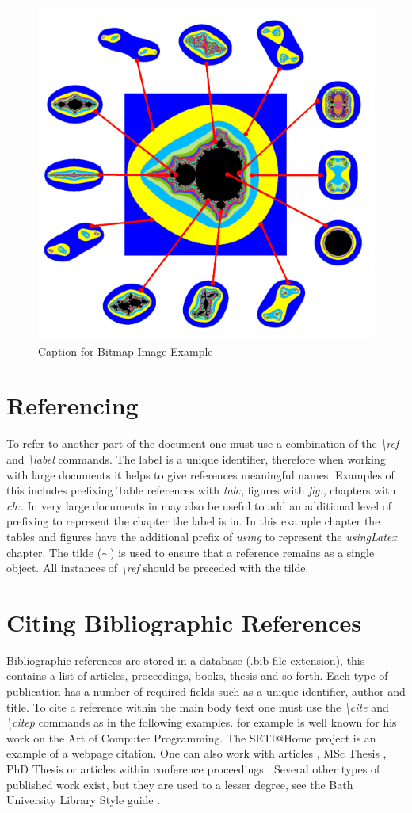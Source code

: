 \begin{figure}[H]
\begin{center}
\includegraphics[width=.34\linewidth]{resources/samplepng}
\caption{Caption for Bitmap Image Example} \label{fig:using:samplepngImage}
\end{center}
\end{figure}

\section{Referencing}

To refer to another part of the document one must use a combination of the \emph{\textbackslash ref} and \emph{\textbackslash label} commands. The label is a unique identifier, therefore when working with large documents it helps to give references meaningful names. Examples of this includes prefixing Table references with \emph{tab:}, figures with \emph{fig:}, chapters with \emph{ch:}. In very large documents in may also be useful to add an additional level of prefixing to represent the chapter the label is in. In this example chapter the tables and figures have the additional prefix of \emph{using} to represent the \emph{usingLatex} chapter. The tilde ($\sim$) is used to ensure that a reference remains as a single object. All instances of \emph{\textbackslash ref} should be preceded with the tilde.

\section{Citing Bibliographic References}

Bibliographic references are stored in a database (.bib file extension), this contains a list of articles, proceedings, books, thesis and so forth. Each type of publication has a number of required fields such as a unique identifier, author and title. To cite a reference within the main body text one must use the \emph{\textbackslash cite} and \emph{\textbackslash citep} commands as in the following examples. \cite{book:knuth_1973} for example is well known for his work on the Art of Computer Programming. The SETI@Home project \citep{online:berkeleyBOINC} is an example of a webpage citation. One can also work with articles \citep{art:Russell:1978:Cray1}, MSc Thesis \citep{msc:Shannon:1940}, PhD Thesis \citep{phd:Sutherland:1963} or articles within conference proceedings \citep{proc:Ewald:1978:HPG}. Several other types of published work exist, but they are used to a lesser degree, see the Bath University Library Style guide \citep{online:Bath:2016:HarvardBathStyle}.

